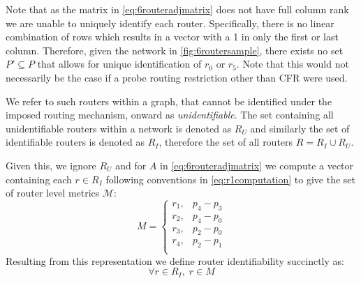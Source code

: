 Note that as the matrix in \cref{eq:6routeradjmatrix} does not have full column rank we are unable to uniquely identify each router. Specifically, there is no linear combination of rows which results in a vector with a 1 in only the first or last column. Therefore, given the network in \cref{fig:6routersample}, there exists no set $P' \subseteq P$ that allows for unique identification of $r_0$ or $r_5$. Note that this would not necessarily be the case if a probe routing restriction other than CFR were used.\par
We refer to such routers within a graph, that cannot be identified under the imposed routing mechanism, onward as \textit{unidentifiable}. The set containing all unidentifiable routers within a network is denoted as $R_U$ and similarly the set of identifiable routers is denoted as $R_I$, therefore the set of all routers $R = R_I\cup R_U$.\par
Given this, we ignore $R_U$ and for $A$ in \cref{eq:6routeradjmatrix} we compute a vector containing each $r \in R_I$ following conventions in \cref{eq:r1computation} to give the set of router level metrics $\mathcal{M}$:
\begin{equation*}
    M = 
    \begin{cases}
    r_1, & p_4-p_3\\
    r_2, & p_4-p_0\\
    r_3, & p_2-p_0\\
    r_4, & p_2-p_1\\
    \end{cases}
\end{equation*}
Resulting from this representation we define router identifiability succinctly as:
\begin{equation}
\label{eq:identifiability}
    \forall r \in R_I,\;r \in M 
\end{equation}
